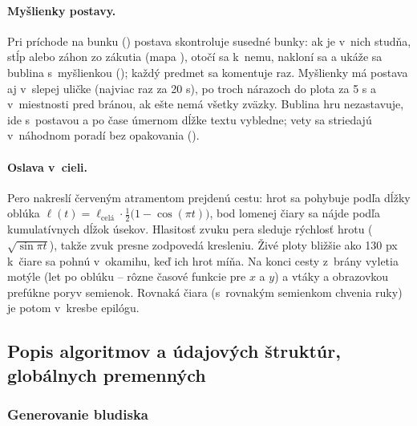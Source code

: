 \documentclass[11pt, a4paper]{article}
\begin{document}
\paragraph{Myšlienky postavy.} Pri príchode na bunku () postava skontroluje
susedné bunky: ak je v~nich studňa, stĺp alebo záhon zo zákutia (mapa ), otočí
sa k~nemu, nakloní sa a ukáže sa bublina s~myšlienkou (); každý predmet sa
komentuje raz. Myšlienky má postava aj v~slepej uličke (najviac raz za 20 s), po troch nárazoch
do plota za 5 s a v~miestnosti pred bránou, ak ešte nemá všetky zväzky. Bublina hru nezastavuje, ide s~postavou a po čase
úmernom dĺžke textu vybledne; vety sa striedajú v~náhodnom poradí bez opakovania ().

\paragraph{Oslava v~cieli.} Pero nakreslí červeným atramentom prejdenú cestu: hrot sa pohybuje
podľa dĺžky oblúka $\ell(t) = \ell_{\text{celá}} \cdot \tfrac12\bigl(1 - \cos(\pi t)\bigr)$, bod
lomenej čiary sa nájde podľa kumulatívnych dĺžok úsekov. Hlasitosť zvuku pera sleduje rýchlosť
hrotu ($\sqrt{\sin \pi t}$), takže zvuk presne zodpovedá kresleniu. Živé ploty bližšie ako 130 px k~čiare sa pohnú v~okamihu, keď ich
hrot míňa. Na konci cesty z~brány vyletia motýle (let po oblúku – rôzne časové funkcie
pre $x$ a $y$) a vtáky a obrazovkou prefúkne poryv semienok. Rovnaká čiara (s~rovnakým
semienkom chvenia ruky) je potom v~kresbe epilógu.

\subsection{Popis algoritmov a údajových štruktúr, globálnych premenných}

\subsubsection{Generovanie bludiska}
\end{document}
